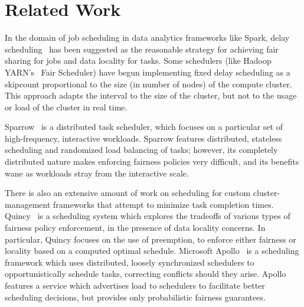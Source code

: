\section{Related Work}\label{sec:related}
In the domain of job scheduling in data analytics frameworks like Spark, delay scheduling~\cite{Zaharia2010} has been suggested as the reasonable strategy for
achieving fair sharing for jobs and data locality for tasks.
Some schedulers (like Hadoop YARN's~\cite{Vavilapalli2013} Fair Scheduler) have begun implementing
fixed delay scheduling as a skipcount proportional to the size (in number of nodes) of the compute cluster. 
This approach adapts the interval to the size of the cluster, but not to the usage or load of the 
cluster in real time.

Sparrow~\cite{Ousterhout2013} is a distributed task scheduler, which focuses on a particular 
set of high-frequency, interactive workloads. Sparrow features distributed, stateless scheduling 
and randomized load balancing of tasks; however, its completely distributed nature makes enforcing
fairness policies very difficult, and its benefits wane as workloads stray from the interactive scale.

There is also an extensive amount of work on scheduling for custom cluster-management frameworks that attempt to minimize task completion times.
Quincy~\cite{Isard:2009} is a scheduling system which explores the tradeoffs of various types of fairness
policy enforcement, in the presence of data locality concerns. In particular, Quincy focuses on the use
of preemption, to enforce either fairness or locality based on a computed optimal schedule.
Microsoft Apollo~\cite{Boutin2014} is a scheduling framework which uses distributed, 
loosely synchronized schedulers to opportunistically schedule tasks, correcting conflicts should they arise.
Apollo features a service which advertises load to schedulers to facilitate better scheduling decisions,
but provides only probabilistic fairness guarantees.
